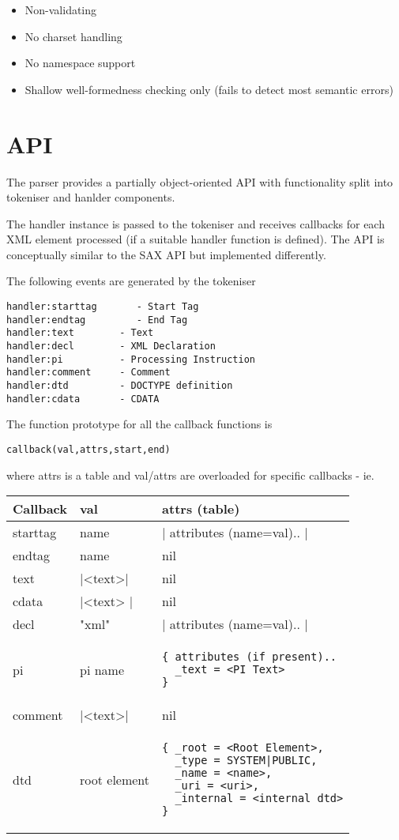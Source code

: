 \documentclass{ltxdoc}
\begin{document}
\begin{itemize}
\item
  Non-validating
\item
  No charset handling
\item
  No namespace support
\item
  Shallow well-formedness checking only (fails to detect most semantic
  errors)
\end{itemize}
\section{API}

The parser provides a partially object-oriented API with functionality
split into tokeniser and hanlder components.

The handler instance is passed to the tokeniser and receives callbacks
for each XML element processed (if a suitable handler function is
defined). The API is conceptually similar to the SAX API but implemented
differently.

The following events are generated by the tokeniser

\begin{verbatim}
handler:starttag       - Start Tag
handler:endtag         - End Tag
handler:text        - Text
handler:decl        - XML Declaration
handler:pi          - Processing Instruction
handler:comment     - Comment
handler:dtd         - DOCTYPE definition
handler:cdata       - CDATA 
\end{verbatim}
The function prototype for all the callback functions is

\begin{verbatim}
callback(val,attrs,start,end)
\end{verbatim}
where attrs is a table and val/attrs are overloaded for specific
callbacks - ie.

\begin{tabular}{llp{5cm}}
Callback   &  val        &    attrs (table)\\
\hline
starttag     &   name &   |{ attributes (name=val).. }|\\
endtag       &   name   &    nil\\
text      &   |<text>| &   nil\\
cdata     &   |<text> |  &   nil\\
decl      &   "xml"       &   |{ attributes (name=val).. }|\\
pi        &   pi name     &  \begin{verbatim}{ attributes (if present)..
  _text = <PI Text>
}\end{verbatim}\\
comment   &   |<text>|      &   nil\\     
dtd       &   root element  & \begin{verbatim}{ _root = <Root Element>,
  _type = SYSTEM|PUBLIC,
  _name = <name>,
  _uri = <uri>,
  _internal = <internal dtd>
}\end{verbatim}\\
\end{tabular}
\end{document}
